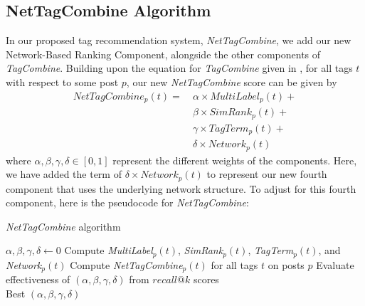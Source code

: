 \documentclass[11pt]{IEEEtran}
\begin{document}
\subsection{NetTagCombine Algorithm}

In our proposed tag recommendation system, \textit{NetTagCombine}, we add our new Network-Based Ranking Component, alongside the other components of \textit{TagCombine}. Building upon the equation for \textit{TagCombine} given in \cite{1}, for all tags $t$ with respect to some post $p$, our new \textit{NetTagCombine} score can be given by
\begin{align*}
NetTagCombine_p(t) =\ &\alpha \times MultiLabel_p(t) +\\
&\beta \times SimRank_p(t) +\\
&\gamma \times TagTerm_p(t) +\\
&\delta \times Network_p(t)
\end{align*}
where $\alpha,\beta,\gamma,\delta \in [0,1]$ represent the different weights of the components. Here, we have added the term of $\delta \times Network_p(t)$ to represent our new fourth component that uses the underlying network structure. To adjust for this fourth component, here is the pseudocode for \textit{NetTagCombine}:


\begin{algorithm*}
  \caption{\textit{NetTagCombine} algorithm}\label{ntc}
  \begin{algorithmic}[1]
    \State $\alpha, \beta, \gamma, \delta \gets 0$
        \State Compute \textit{MultiLabel}$_p(t)$, \textit{SimRank}$_p(t)$, \textit{TagTerm}$_p(t)$, and \textit{Network$_p(t)$}
      \EndFor
    \EndFor
            \State Compute \textit{NetTagCombine}$_p(t)$ for all tags $t$ on posts $p$
            \State Evaluate effectiveness of $(\alpha,\beta,\gamma,\delta)$ from $recall@k$ scores
          \EndFor
        \EndFor
      \EndFor
    \EndFor\\
    \Return Best $(\alpha,\beta,\gamma,\delta)$\;
  \end{algorithmic}
\end{algorithm*}
\end{document}
